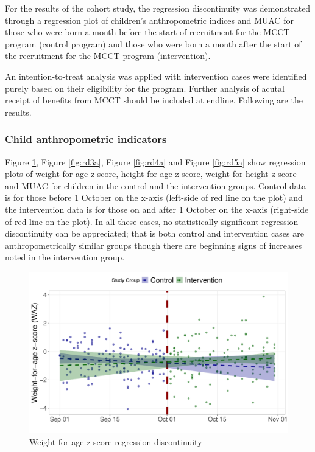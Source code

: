 \documentclass[12pt,a4paper]{article}
\begin{document}
For the results of the cohort study, the regression discontinuity was demonstrated through a regression plot of children's anthropometric indices and MUAC for those who were born a month before the start of recruitment for the MCCT program (control program) and those who were born a month after the start of the recruitment for the MCCT program (intervention).

An intention-to-treat analysis was applied with intervention cases were identified purely based on their eligibility for the program. Further analysis of acutal receipt of benefits from MCCT should be included at endline. Following are the results.

\hypertarget{child-anthropometric-indicators}{%
\subsubsection{Child anthropometric indicators}\label{child-anthropometric-indicators}}

Figure \ref{fig:rd2a}, Figure \ref{fig:rd3a}, Figure \ref{fig:rd4a} and Figure \ref{fig:rd5a} show regression plots of weight-for-age z-score, height-for-age z-score, weight-for-height z-score and MUAC for children in the control and the intervention groups. Control data is for those before 1 October on the x-axis (left-side of red line on the plot) and the intervention data is for those on and after 1 October on the x-axis (right-side of red line on the plot). In all these cases, no statistically significant regression discontinuity can be appreciated; that is both control and intervention cases are anthropometrically similar groups though there are beginning signs of increases noted in the intervention group.

\begin{figure}[H]

{\centering \includegraphics{kayinReport_files/figure-latex/rd2a-1} 

}

\caption{Weight-for-age z-score regression discontinuity}\label{fig:rd2a}
\end{figure}
\end{document}
